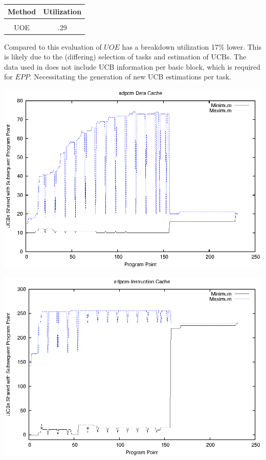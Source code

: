 \begin{minipage}{\linewidth}
  \bigskip
  \centering
    \begin{tabular}{c | c}
      Method & Utilization \\
      \hline
      \\
      UOE & .29 \\
    \end{tabular}
\end{minipage}

Compared to \cite{lunniss:13} this evaluation of ${UOE}$ has a
breakdown utilization 17\% lower. This is likely due to the
(differing) selection of tasks and estimation of UCBs. The data used
in \cite{lunniss:13} does not include UCB information per basic block,
which is required for ${EPP}$. Necessitating the generation of new
UCB estimations per task.
%
%
\begin{center}
  \includegraphics[width=\linewidth]{eps/adpcm-dcache.eps}
\end{center}
\begin{center}
  \includegraphics[width=\linewidth]{eps/adpcm-icache.eps}
\end{center}
